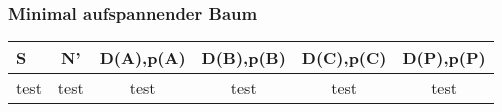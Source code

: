 \documentclass{article}
\begin{document}
			\subsubsection{Minimal aufspannender Baum}
				\begin{tabular}{| l | c | c | c | c | c |}
					\hline
					S	&	N'	&	D(A),p(A)	&	D(B),p(B)	&	D(C),p(C)	&	D(P),p(P) 	\\ \hline
					test&test	&test			&test			&test			&test			\\ \hline
				\end{tabular}
			
			
			
			
			
			
			
			
			
			
			
			
			
			
			
			
			
			
			
			
			
			
			
			
			
			
			
			
			
			
			
			
			
			
			
			
			
			
			
			
			
			
			
			
			
			
			
			
			
			
			
			
\end{document}
